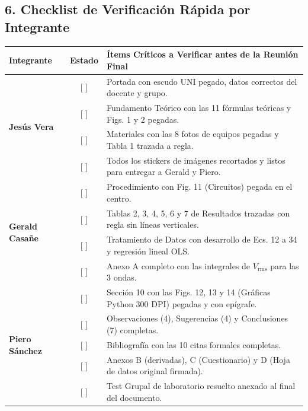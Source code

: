 \documentclass[a4paper, 10pt]{article}
\begin{document}
\vspace{0.1cm}

\subsection*{\color{uni-blue}6. Checklist de Verificación Rápida por Integrante}

\begin{center}
    \footnotesize
    \begin{tabularx}{\linewidth}{@{}lcX@{}}
        \toprule
        \textbf{Integrante} & \textbf{Estado} & \textbf{Ítems Críticos a Verificar antes de la Reunión Final} \\
        \midrule
        \multirow{4}{*}{\textbf{Jesús Vera}} 
        & [ ] & Portada con escudo UNI pegado, datos correctos del docente y grupo. \\
        & [ ] & Fundamento Teórico con las 11 fórmulas teóricas y Figs. 1 y 2 pegadas. \\
        & [ ] & Materiales con las 8 fotos de equipos pegadas y Tabla 1 trazada a regla. \\
        & [ ] & Todos los stickers de imágenes recortados y listos para entregar a Gerald y Piero. \\
        \midrule
        \multirow{4}{*}{\textbf{Gerald Casañe}} 
        & [ ] & Procedimiento con Fig. 11 (Circuitos) pegada en el centro. \\
        & [ ] & Tablas 2, 3, 4, 5, 6 y 7 de Resultados trazadas con regla sin líneas verticales. \\
        & [ ] & Tratamiento de Datos con desarrollo de Ecs. 12 a 34 y regresión lineal OLS. \\
        & [ ] & Anexo A completo con las integrales de $V_{\text{rms}}$ para las 3 ondas. \\
        \midrule
        \multirow{5}{*}{\textbf{Piero Sánchez}} 
        & [ ] & Sección 10 con las Figs. 12, 13 y 14 (Gráficas Python 300 DPI) pegadas y con epígrafe. \\
        & [ ] & Observaciones (4), Sugerencias (4) y Conclusiones (7) completas. \\
        & [ ] & Bibliografía con las 10 citas formales completas. \\
        & [ ] & Anexos B (derivadas), C (Cuestionario) y D (Hoja de datos original firmada). \\
        & [ ] & Test Grupal de laboratorio resuelto anexado al final del documento. \\
        \bottomrule
    \end{tabularx}
\end{center}
\end{document}
